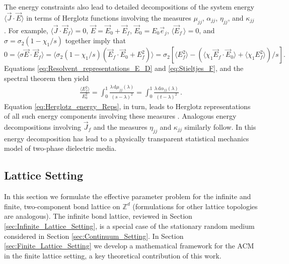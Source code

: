 \documentclass{cmslatex}
\renewcommand{\d}{\text{d}}
\begin{document}
The energy constraints also lead to detailed decompositions of the
system energy $\langle\vec{J}\cdot\vec{E}\rangle$ in terms of Herglotz functions
involving the measures $\mu_{jj}$, $\alpha_{jj}$, $\eta_{jj}$, and $\kappa_{jj}$
\cite{Murphy:JMP:063506,Murphy_Thermo_Stat_Mech}. For 
example, $\langle\vec{J}\cdot\vec{E}_f\rangle=0$, $\vec{E}=\vec{E}_0+\vec{E}_f$, 
$\vec{E}_0=E_0\vec{e}_j$, $\langle\vec{E}_f\,\rangle=0$, and $\sigma=\sigma_2(1-\chi_1/s)$ together
imply that $0=\langle\sigma\vec{E}\cdot\vec{E}_f\rangle=\langle\sigma_2(1-\chi_1/s)(\vec{E}_f\cdot\vec{E}_0+E_f^2)\rangle 
=\sigma_2\left[\langle E_f^2\rangle- (\langle\chi_1\vec{E}_f\cdot\vec{E}_0\rangle+\langle\chi_1E_f^2\rangle)/s\right].$
Equations \eqref{eq:Resolvent_representations_E_D} and
\eqref{eq:Stieltjes_F}, and the spectral theorem \cite{Reed-1980} then
yield \cite{Murphy:JMP:063506,Murphy_Thermo_Stat_Mech}  
%
\begin{align}\label{eq:Herglotz_energy_Reps}
 \frac{\langle E_f^2\rangle}{E_0^2}=\int_0^1 \frac{\lambda\,\d\mu_{jj}(\lambda)}{(s-\lambda)^2}
           =\int_0^1 \frac{\lambda\,\d\alpha_{jj}(\lambda)}{(t-\lambda)^2}\,. 
\end{align}
%
Equation \eqref{eq:Herglotz_energy_Reps}, in turn, leads to Herglotz
representations of all such energy components involving
these measures \cite{Murphy_Thermo_Stat_Mech}. Analogous energy
decompositions involving $\vec{J}_f$ and the measures $\eta_{jj}$ and
$\kappa_{jj}$ similarly follow. In \cite{Murphy_Thermo_Stat_Mech} this
energy decomposition has lead to a physically transparent statistical
mechanics model of two-phase dielectric media.


\subsection{Lattice Setting}
\label{sec:Lattice_Setting}
%
In this section we formulate the effective parameter problem for the
infinite and finite, two-component bond lattice on $\mathbb{Z}^d$
(formulations for other lattice topologies are analogous). The
infinite bond lattice, reviewed in Section
\ref{sec:Infinite_Lattice_Setting}, is a special case of the
stationary random medium considered in Section
\ref{sec:Continuum_Setting}. In Section
\ref{sec:Finite_Lattice_Setting} we develop a mathematical framework
for the ACM in the finite lattice setting, a key theoretical
contribution of this work. 
\end{document}
